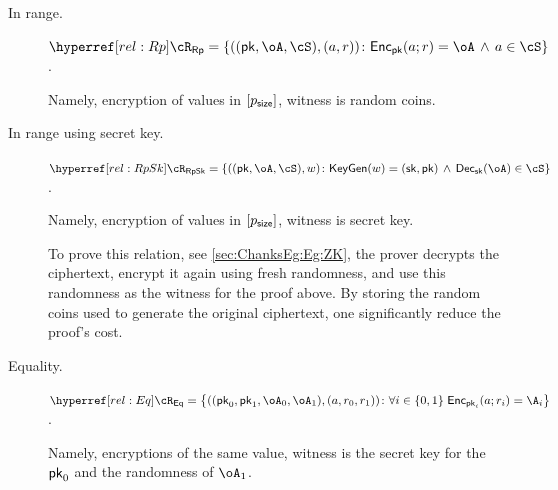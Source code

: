 \begin{description}
	\item[In range.] $\rRp =\rRpDef$.\label{rel:Rp}
	
	Namely, encryption of values in $[p_{\mathsf{size}}]$, witness is random coins.
	
		\item[In range using secret key.] $\rRpSk =\rRpSkDef$.\label{rel:RpSk}
		
		
		Namely, encryption of values in $[p_{\mathsf{size}}]$, witness is secret key. 
		\begin{remark}
			To prove this relation, see \cref{sec:ChanksEg:Eg:ZK}, the prover decrypts the ciphertext, encrypt it again using fresh randomness, and use this randomness as the witness for the proof above. By storing the random coins used to generate the original ciphertext, one significantly reduce the proof's cost.
		\end{remark}
		
	\item[Equality.] $\rEq =\rEqDef$. \label{rel:Eq}
	
	Namely,   encryptions of the same value, witness is the  secret key for the ${\mathsf{pk}}_0$ and the randomness of  $\oA_1$.
	

\end{description}




